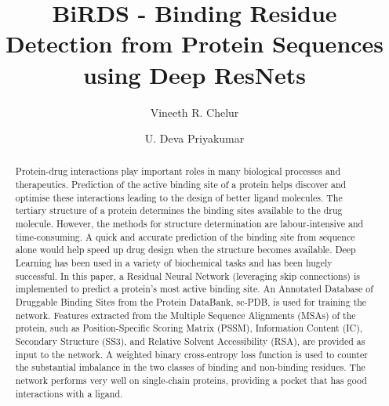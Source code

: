 \documentclass[journal=jacsat,manuscript=article]{achemso}
\author{Vineeth R. Chelur}
\author{U. Deva Priyakumar}
\affiliation[IIIT-H]
{Center for Computational Natural Sciences \& Bioinformatics \\ International Institute of Information Technology \\ Hyderabad - 500032, India}
\title[BiRDS - Binding Residue Detection from Protein Sequences using Deep ResNets]
  {BiRDS - Binding Residue Detection from Protein Sequences using Deep ResNets
  }
\begin{document}






\begin{abstract}
    \noindent Protein-drug interactions play important roles in many biological processes and therapeutics. Prediction of the active binding site of a protein helps discover and optimise these interactions leading to the design of better ligand molecules. The tertiary structure of a protein determines the binding sites available to the drug molecule. However, the methods for structure determination are labour-intensive and time-consuming. A quick and accurate prediction of the binding site from sequence alone would help speed up drug design when the structure becomes available. Deep Learning has been used in a variety of biochemical tasks and has been hugely successful. In this paper, a Residual Neural Network (leveraging skip connections) is implemented to predict a protein's most active binding site. An Annotated Database of Druggable Binding Sites from the Protein DataBank, sc-PDB, is used for training the network. Features extracted from the Multiple Sequence Alignments (MSAs) of the protein, such as Position-Specific Scoring Matrix (PSSM), Information Content (IC), Secondary Structure (SS3), and Relative Solvent Accessibility (RSA), are provided as input to the network. A weighted binary cross-entropy loss function is used to counter the substantial imbalance in the two classes of binding and non-binding residues. The network performs very well on single-chain proteins, providing a pocket that has good interactions with a ligand.
\end{abstract}
\end{document}

